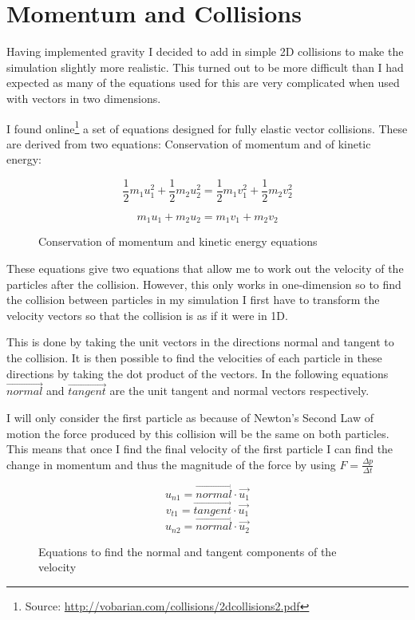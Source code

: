 \section{Momentum  and Collisions}
	Having implemented gravity I decided to add in simple 2D collisions to make the simulation slightly more realistic. This turned out to be more difficult than I had expected as many of the equations used for this are very complicated when used with vectors in two dimensions.
	
	I found online\footnote{Source: \url{http://vobarian.com/collisions/2dcollisions2.pdf}} a set of equations designed for fully elastic vector collisions. These are derived from two equations: Conservation of momentum and of kinetic energy:
	
	\begin{figure}[h]
		\begin{equation}
		\frac{1}{2}m_{1}u_{1}^2 + \frac{1}{2}m_{2}u_{2}^2 = \frac{1}{2}m_{1}v_{1}^2 + \frac{1}{2}m_{2}v_{2}^2
		\end{equation}
		
		\begin{equation}
		m_{1}u_{1} + m_{2}u_{2} = m_{1}v_{1} + m_{2}v_{2}
		\end{equation}
		\caption{Conservation of momentum and kinetic energy equations}
		\label{fig:movEqn}
	\end{figure}

	These equations give two equations that allow me to work out the velocity of the particles after the collision. However, this only works in one-dimension so to find the collision between particles in my simulation I first have to transform the velocity vectors so that the collision is as if it were in 1D. 
	
	This is done by taking the unit vectors in the directions normal and tangent to the collision. It is then possible to find the velocities of each particle in these directions by taking the dot product of the vectors. In the following equations $\vec{normal}$ and $\vec{tangent}$ are the unit tangent and normal vectors respectively.
	
	I will only consider the first particle as because of Newton's Second Law of motion the force produced by this collision will be the same on both particles. This means that once I find the final velocity of the first particle I can find the change in momentum and thus the magnitude of the force by using $F = \frac{\Delta p}{\Delta t}$
	
	\begin{figure}[h!]
		\begin{equation}
			u_{n1} = \vec{normal} \cdot \vec{u_1}
		\end{equation}
		\begin{equation}
			v_{t1} = \vec{tangent} \cdot \vec{u_1}
		\end{equation}
		\begin{equation}
			u_{n2} = \vec{normal} \cdot \vec{u_2}
		\end{equation}
		\caption{Equations to find the normal and tangent components of the velocity}
		\label{fig:compEqn}
	\end{figure}
		
